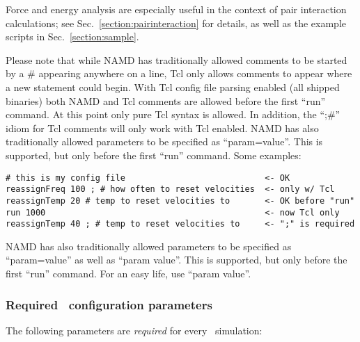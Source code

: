 \begin{itemize}
    Force and energy analysis are especially useful in the context of 
    pair interaction calculations; see Sec.~\ref{section:pairinteraction}
    for details, as well as the example scripts in Sec.~\ref{section:sample}.
\end{itemize}

Please note that while NAMD has traditionally allowed comments to be
started by a \# appearing anywhere on a line, Tcl only allows comments
to appear where a new statement could begin.  With Tcl config file
parsing enabled (all shipped binaries) both NAMD and Tcl comments are
allowed before the first ``run'' command.  At this point only pure Tcl
syntax is allowed.  In addition, the ``;\#'' idiom for Tcl comments will
only work with Tcl enabled.  NAMD has also traditionally allowed
parameters to be specified as ``param=value''.  This is supported, but
only before the first ``run'' command.  Some examples:

\begin{verbatim}
# this is my config file                            <- OK
reassignFreq 100 ; # how often to reset velocities  <- only w/ Tcl
reassignTemp 20 # temp to reset velocities to       <- OK before "run"
run 1000                                            <- now Tcl only
reassignTemp 40 ; # temp to reset velocities to     <- ";" is required
\end{verbatim}

NAMD has also traditionally allowed parameters to be specified as
``param=value'' as well as ``param value''.  This is supported, but only
before the first ``run'' command.  For an easy life, use ``param value''.

\subsubsection{Required \NAMD\ configuration parameters}
\label{section:requiredparams}

The following parameters are {\em required} for every
\NAMD\ simulation:

